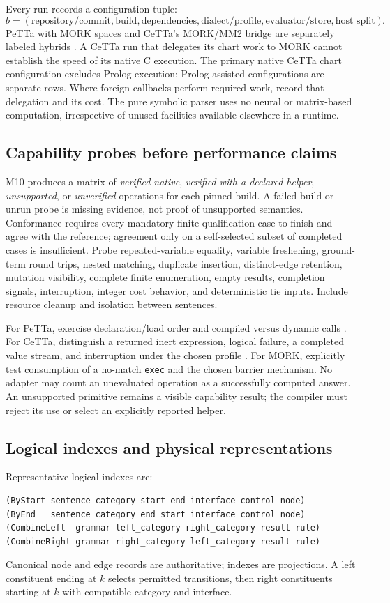 \documentclass[11pt,a4paper]{article}
\newcommand{\code}[1]{\texttt{#1}}
\begin{document}
Every run records a configuration tuple:
\[
 b=(\text{repository/commit},\text{build},\text{dependencies},
     \text{dialect/profile},\text{evaluator/store},\text{host split}).
\]
PeTTa with MORK spaces and CeTTa's MORK/MM2 bridge are separately labeled
hybrids \cite{petta,cetta}. A CeTTa run that delegates its chart work to
MORK cannot establish the speed of its native C execution. The primary native CeTTa chart configuration excludes Prolog execution;
Prolog-assisted configurations are separate rows. Where foreign callbacks
perform required work, record that delegation and its cost.
The pure symbolic parser uses no neural or matrix-based computation,
irrespective of unused facilities available elsewhere in a runtime.

\subsection{Capability probes before performance claims}
M10 produces a matrix of \emph{verified native}, \emph{verified with a
declared helper}, \emph{unsupported}, or \emph{unverified} operations for
each pinned build. A failed build or unrun probe is missing evidence, not
proof of unsupported semantics. Conformance requires every mandatory finite
qualification case to finish and agree with the reference; agreement only on
a self-selected subset of completed cases is insufficient.
Probe repeated-variable equality, variable freshening, ground-term
round trips, nested matching, duplicate insertion, distinct-edge retention,
mutation visibility, complete finite enumeration, empty results, completion
signals, interruption, integer cost behavior, and deterministic tie inputs.
Include resource cleanup and isolation between sentences.

For PeTTa, exercise declaration/load order and compiled versus dynamic
calls \cite{pettacompiler}. For CeTTa, distinguish a returned inert
expression, logical failure, a completed value stream, and interruption
under the chosen profile \cite{cettaledger}. For MORK, explicitly test
consumption of a no-match \code{exec} and the chosen barrier mechanism.
No adapter may count an unevaluated operation as a successfully computed
answer. An unsupported primitive remains a visible capability result;
the compiler must reject its use or select an explicitly reported helper.

\subsection{Logical indexes and physical representations}
Representative logical indexes are:
\begin{lstlisting}
(ByStart sentence category start end interface control node)
(ByEnd   sentence category end start interface control node)
(CombineLeft  grammar left_category right_category result rule)
(CombineRight grammar right_category left_category result rule)
\end{lstlisting}
Canonical node and edge records are authoritative; indexes are projections.
A left constituent ending at \(k\) selects permitted transitions, then
right constituents starting at \(k\) with compatible category and interface.
\end{document}
